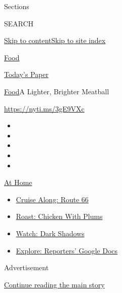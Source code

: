 Sections

SEARCH

\protect\hyperlink{site-content}{Skip to
content}\protect\hyperlink{site-index}{Skip to site index}

\href{https://www.nytimes3xbfgragh.onion/section/food}{Food}

\href{https://myaccount.nytimes3xbfgragh.onion/auth/login?response_type=cookie\&client_id=vi}{}

\href{https://www.nytimes3xbfgragh.onion/section/todayspaper}{Today's
Paper}

\href{/section/food}{Food}\textbar{}A Lighter, Brighter Meatball

\url{https://nyti.ms/3gE9VXc}

\begin{itemize}
\item
\item
\item
\item
\item
\end{itemize}

\href{https://www.nytimes3xbfgragh.onion/spotlight/at-home?action=click\&pgtype=Article\&state=default\&region=TOP_BANNER\&context=at_home_menu}{At
Home}

\begin{itemize}
\tightlist
\item
  \href{https://www.nytimes3xbfgragh.onion/2020/09/07/travel/route-66.html?action=click\&pgtype=Article\&state=default\&region=TOP_BANNER\&context=at_home_menu}{Cruise
  Along: Route 66}
\item
  \href{https://www.nytimes3xbfgragh.onion/2020/09/04/dining/sheet-pan-chicken.html?action=click\&pgtype=Article\&state=default\&region=TOP_BANNER\&context=at_home_menu}{Roast:
  Chicken With Plums}
\item
  \href{https://www.nytimes3xbfgragh.onion/2020/09/04/arts/television/dark-shadows-stream.html?action=click\&pgtype=Article\&state=default\&region=TOP_BANNER\&context=at_home_menu}{Watch:
  Dark Shadows}
\item
  \href{https://www.nytimes3xbfgragh.onion/interactive/2020/at-home/even-more-reporters-editors-diaries-lists-recommendations.html?action=click\&pgtype=Article\&state=default\&region=TOP_BANNER\&context=at_home_menu}{Explore:
  Reporters' Google Docs}
\end{itemize}

Advertisement

\protect\hyperlink{after-top}{Continue reading the main story}

